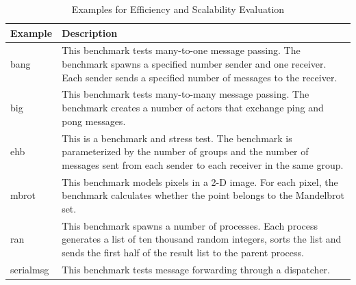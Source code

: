 \begin{table}[t]
\label{efficiency_description}

\begin{center}
\begin{tabular}{| l | p{15 cm} |}
\hline

Example & Description \\
\hline
bang & This benchmark tests many-to-one message passing.  The benchmark
spawns a specified number sender and one receiver.  Each sender sends a
specified number of messages to the receiver.\\
\hline
big & This benchmark tests many-to-many message passing.  The benchmark
creates a number of actors that exchange ping and pong messages. \\
\hline
ehb & This is a benchmark and stress test.  The benchmark is
parameterized by the number of groups and the number of messages sent from each
sender to each receiver in the same group. \\
\hline
mbrot & This benchmark models pixels in a 2-D image.  For each pixel,
the benchmark calculates whether the point belongs to the Mandelbrot set. \\
\hline

ran & This benchmark spawns a number of processes.  Each process
generates a list of ten thousand random integers, sorts the list and sends the
first half of the result list to the parent process. \\
\hline
 serialmsg & This benchmark tests message forwarding through a
dispatcher. \\
\hline
\end{tabular}
\caption{Examples for Efficiency and Scalability Evaluation}
\end{center}
\end{table}


